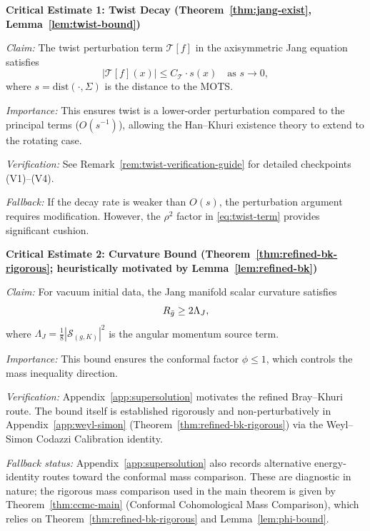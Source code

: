 \medskip
\textbf{Critical Estimate 1: Twist Decay (Theorem~\ref{thm:jang-exist}, Lemma~\ref{lem:twist-bound})}

\textit{Claim:} The twist perturbation term $\mathcal{T}[f]$ in the axisymmetric Jang equation satisfies
\[
|\mathcal{T}[f](x)| \leq C_\mathcal{T} \cdot s(x) \quad \text{as } s \to 0,
\]
where $s = \mathrm{dist}(\cdot, \Sigma)$ is the distance to the MOTS.

\textit{Importance:} This ensures twist is a lower-order perturbation compared to the principal terms ($O(s^{-1})$), allowing the Han--Khuri existence theory to extend to the rotating case.

\textit{Verification:} See Remark~\ref{rem:twist-verification-guide} for detailed checkpoints (V1)--(V4).

\textit{Fallback:} If the decay rate is weaker than $O(s)$, the perturbation argument requires modification. However, the $\rho^2$ factor in \eqref{eq:twist-term} provides significant cushion.

\medskip
\textbf{Critical Estimate 2: Curvature Bound (Theorem~\ref{thm:refined-bk-rigorous}; heuristically motivated by Lemma~\ref{lem:refined-bk})}

\textit{Claim:} For vacuum initial data, the Jang manifold scalar curvature satisfies
\[
R_{\bar{g}} \geq 2\Lambda_J,
\]
where $\Lambda_J = \frac{1}{8}|\mathcal{S}_{(g,K)}|^2$ is the angular momentum source term.

\textit{Importance:} This bound ensures the conformal factor $\phi \leq 1$, which controls the mass inequality direction.

\textit{Verification:} Appendix~\ref{app:supersolution} motivates the refined Bray--Khuri route. The bound itself is established rigorously and non-perturbatively in Appendix~\ref{app:weyl-simon} (Theorem~\ref{thm:refined-bk-rigorous}) via the Weyl--Simon Codazzi Calibration identity.

\textit{Fallback status:} Appendix~\ref{app:supersolution} also records alternative energy-identity routes toward the conformal mass comparison. These are diagnostic in nature; the rigorous mass comparison used in the main theorem is given by Theorem~\ref{thm:ccmc-main} (Conformal Cohomological Mass Comparison), which relies on Theorem~\ref{thm:refined-bk-rigorous} and Lemma~\ref{lem:phi-bound}.

